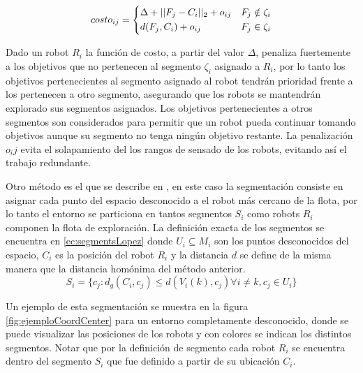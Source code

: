 \begin{equation}\label{ec:costsolanas}
costo_{ij} = 
\begin{dcases}
  \Delta + || F_j - C_i ||_2 + o_{ij} & F_j \notin \zeta_i \\
  d(F_j, C_i) + o_{ij}                & F_j \in    \zeta_i
\end{dcases}
\end{equation}

Dado un robot $R_i$ la función de costo, a partir del valor $\Delta$, penaliza fuertemente a los objetivos que no pertenecen al segmento $\zeta_i$ asignado a $R_i$, por lo tanto los objetivos pertenecientes al segmento asignado al robot tendrán prioridad frente a los pertenecen a otro segmento, asegurando que los robots se mantendrán explorado sus segmentos asignados. Los objetivos pertenecientes a otros segmentos son considerados para permitir que un robot pueda continuar tomando objetivos aunque su segmento no tenga ningún objetivo restante. La penalización $o_ij$ evita el solapamiento del los rangos de sensado de los robots, evitando así el trabajo redundante.\medbreak

Otro método es el que se describe en \cite{Lopez-Perez2018}, en este caso la segmentación consiste en asignar cada punto del espacio desconocido a el robot más cercano de la flota, por lo tanto el entorno se particiona en tantos segmentos $S_i$ como robots $R_i$ componen la flota de exploración. La definición exacta de los segmentos se encuentra en \eqref{ec:segmentsLopez} donde $U_i \subseteq M_i$ son los puntos desconocidos del espacio, $C_i$ es la posición del robot $R_i$ y la distancia $d$ se define de la misma manera que la distancia homónima del método anterior.
\begin{equation}\label{ec:segmentsLopez}
  S_i=\{c_j:d_g(C_i,c_j)\leq d(V_i(k),c_j) \forall i \neq k , c_j \in U_i\}
\end{equation}


Un ejemplo de esta segmentación se muestra en la figura \ref{fig:ejemploCoordCenter} para un entorno completamente desconocido, donde se puede visualizar las posiciones de los robots y con colores se indican los distintos segmentos. Notar que por la definición de segmento cada robot $R_i$ se encuentra dentro del segmento $S_i$ que fue definido a partir de su ubicación $C_i$. %

